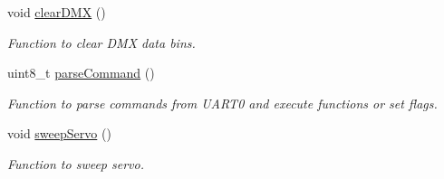 \begin{DoxyCompactItemize}
void \mbox{\hyperlink{satej__matthew_8c_a90f05ed3280bc7f2e971ed7216028960}{clear\+D\+MX}} ()
\begin{DoxyCompactList}\small\item\em Function to clear D\+MX data bins. \end{DoxyCompactList}\item 
uint8\+\_\+t \mbox{\hyperlink{satej__matthew_8c_a784ef656236362513864c6ba3507e22d}{parse\+Command}} ()
\begin{DoxyCompactList}\small\item\em Function to parse commands from U\+A\+R\+T0 and execute functions or set flags. \end{DoxyCompactList}\item 
void \mbox{\hyperlink{satej__matthew_8c_a086130ac68735e2ba8d56b2dfe45b914}{sweep\+Servo}} ()
\begin{DoxyCompactList}\small\item\em Function to sweep servo. \end{DoxyCompactList}\end{DoxyCompactItemize}
